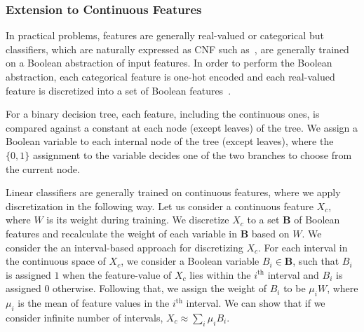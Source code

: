 \subsubsection{Extension to Continuous Features}
In practical problems, features are generally real-valued or categorical but classifiers, which are naturally expressed as CNF such as~\cite{GMM2020}, are generally trained on a Boolean abstraction of input features. In order to perform the Boolean abstraction, each categorical feature is one-hot encoded and each real-valued feature is discretized into a set of Boolean features~\cite{lakkaraju2019faithful,GMM2020}. 

For a binary decision tree, each feature, including the continuous ones, is compared against a constant at each node (except leaves) of the tree. We assign a Boolean variable to each internal node of the tree (except leaves), where the $ \{0,1\} $ assignment to the variable decides one of the two branches to choose from the current node.  

Linear classifiers are generally trained on continuous features, where we apply discretization in the following way. Let us consider a continuous feature $X_c$, where $W$ is its weight during training. We discretize $ X_c $ to a set $ \mathbf{B} $ of Boolean features and recalculate the weight of each variable in $ \mathbf{B} $ based on $ W $. We consider the an interval-based approach for discretizing $ X_c $. For each interval in the continuous space of $X_c$, we consider a Boolean variable $B_i \in \mathbf{B}$, such that $ B_i $ is assigned $ 1 $ when the feature-value of $X_c$ lies within the $i^{\mathrm{th}}$ interval and $ B_i $ is assigned $ 0 $ otherwise. Following that, we assign the weight of $ B_i $ to be $ \mu_iW $, where $ \mu_i $ is the mean of feature values in the $i^{\mathrm{th}}$ interval. We can show that if we consider infinite number of intervals, $ X_c \approx \sum_i \mu_i B_i $. 



